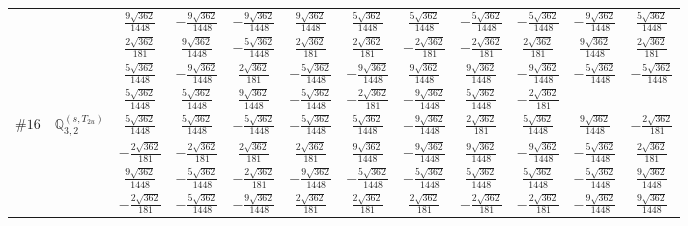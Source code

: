 \documentclass[fleqn,9pt,landscape]{jsarticle}
\begin{document}
\begin{center}
\begin{longtable}{lcccccccccc}
& $ \frac{9 \sqrt{362}}{1448} $ & $ - \frac{9 \sqrt{362}}{1448} $ & $ - \frac{9 \sqrt{362}}{1448} $ & $ \frac{9 \sqrt{362}}{1448} $ & $ \frac{5 \sqrt{362}}{1448} $ & $ \frac{5 \sqrt{362}}{1448} $ & $ - \frac{5 \sqrt{362}}{1448} $ & $ - \frac{5 \sqrt{362}}{1448} $ & $ - \frac{9 \sqrt{362}}{1448} $ & $ \frac{5 \sqrt{362}}{1448} $ \\
& $ \frac{2 \sqrt{362}}{181} $ & $ \frac{9 \sqrt{362}}{1448} $ & $ - \frac{5 \sqrt{362}}{1448} $ & $ \frac{2 \sqrt{362}}{181} $ & $ \frac{2 \sqrt{362}}{181} $ & $ - \frac{2 \sqrt{362}}{181} $ & $ - \frac{2 \sqrt{362}}{181} $ & $ \frac{2 \sqrt{362}}{181} $ & $ \frac{9 \sqrt{362}}{1448} $ & $ \frac{2 \sqrt{362}}{181} $ \\
& $ \frac{5 \sqrt{362}}{1448} $ & $ - \frac{9 \sqrt{362}}{1448} $ & $ \frac{2 \sqrt{362}}{181} $ & $ - \frac{5 \sqrt{362}}{1448} $ & $ - \frac{9 \sqrt{362}}{1448} $ & $ \frac{9 \sqrt{362}}{1448} $ & $ \frac{9 \sqrt{362}}{1448} $ & $ - \frac{9 \sqrt{362}}{1448} $ & $ - \frac{5 \sqrt{362}}{1448} $ & $ - \frac{5 \sqrt{362}}{1448} $ \\
& $ \frac{5 \sqrt{362}}{1448} $ & $ \frac{5 \sqrt{362}}{1448} $ & $ \frac{9 \sqrt{362}}{1448} $ & $ - \frac{5 \sqrt{362}}{1448} $ & $ - \frac{2 \sqrt{362}}{181} $ & $ - \frac{9 \sqrt{362}}{1448} $ & $ \frac{5 \sqrt{362}}{1448} $ & $ - \frac{2 \sqrt{362}}{181} $ & $  $ & $  $ \\ \hline
$ \#16\quad \mathbb{Q}_{3,2}^{(s,T_{2u})} $ & $ \frac{5 \sqrt{362}}{1448} $ & $ \frac{5 \sqrt{362}}{1448} $ & $ - \frac{5 \sqrt{362}}{1448} $ & $ - \frac{5 \sqrt{362}}{1448} $ & $ \frac{5 \sqrt{362}}{1448} $ & $ - \frac{9 \sqrt{362}}{1448} $ & $ \frac{2 \sqrt{362}}{181} $ & $ \frac{5 \sqrt{362}}{1448} $ & $ \frac{9 \sqrt{362}}{1448} $ & $ - \frac{2 \sqrt{362}}{181} $ \\
& $ - \frac{2 \sqrt{362}}{181} $ & $ - \frac{2 \sqrt{362}}{181} $ & $ \frac{2 \sqrt{362}}{181} $ & $ \frac{2 \sqrt{362}}{181} $ & $ \frac{9 \sqrt{362}}{1448} $ & $ - \frac{9 \sqrt{362}}{1448} $ & $ \frac{9 \sqrt{362}}{1448} $ & $ - \frac{9 \sqrt{362}}{1448} $ & $ - \frac{5 \sqrt{362}}{1448} $ & $ \frac{2 \sqrt{362}}{181} $ \\
& $ \frac{9 \sqrt{362}}{1448} $ & $ - \frac{5 \sqrt{362}}{1448} $ & $ - \frac{2 \sqrt{362}}{181} $ & $ - \frac{9 \sqrt{362}}{1448} $ & $ - \frac{5 \sqrt{362}}{1448} $ & $ - \frac{5 \sqrt{362}}{1448} $ & $ \frac{5 \sqrt{362}}{1448} $ & $ \frac{5 \sqrt{362}}{1448} $ & $ - \frac{5 \sqrt{362}}{1448} $ & $ \frac{9 \sqrt{362}}{1448} $ \\
& $ - \frac{2 \sqrt{362}}{181} $ & $ - \frac{5 \sqrt{362}}{1448} $ & $ - \frac{9 \sqrt{362}}{1448} $ & $ \frac{2 \sqrt{362}}{181} $ & $ \frac{2 \sqrt{362}}{181} $ & $ \frac{2 \sqrt{362}}{181} $ & $ - \frac{2 \sqrt{362}}{181} $ & $ - \frac{2 \sqrt{362}}{181} $ & $ - \frac{9 \sqrt{362}}{1448} $ & $ \frac{9 \sqrt{362}}{1448} $ \\

\end{longtable}
\end{center}
\end{document}
